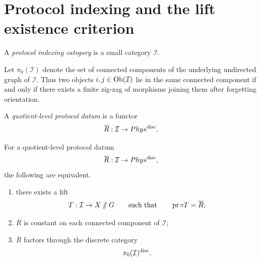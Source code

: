 \section{Protocol indexing and the lift existence criterion}
\label{sec:lift-protocol}
\begin{definition}
	A \emph{protocol indexing category} is a small category \(\mathcal I\).
\end{definition}
\begin{definition}
	Let \(\pi_0(\mathcal I)\) denote the set of connected components of the
	underlying undirected graph of \(\mathcal I\).
	Thus two objects \(i,j\in\operatorname{Ob}(\mathcal I)\) lie in the same connected
	component if and only if there exists a finite zig-zag of morphisms
	joining them after forgetting orientation.
\end{definition}
\begin{definition}
	A \emph{quotient-level protocol datum} is a functor
	\[
		\overline R:\mathcal I\to Phys^{\mathrm{disc}}.
	\]
\end{definition}
\begin{lemma}
	\label{lem:lift-existence}
	For a quotient-level protocol datum
	\[
		\overline R:\mathcal I\to Phys^{\mathrm{disc}},
	\]
	the following are equivalent.
	\begin{enumerate}[label=\textup{(\roman*)}]
		\item there exists a lift
		      \[
			      T:\mathcal I\to X\mathbin{/\mkern-6mu/} G
			      \qquad
			      \text{such that}
			      \qquad
			      \operatorname{pr}\circ T=\overline R;
		      \]
		\item \(\overline R\) is constant on each connected component of
		      \(\mathcal I\);
		\item \(\overline R\) factors through the discrete category
		      \[
			      \pi_0(\mathcal I)^{\mathrm{disc}}.
		      \]
	\end{enumerate}
\end{lemma}
